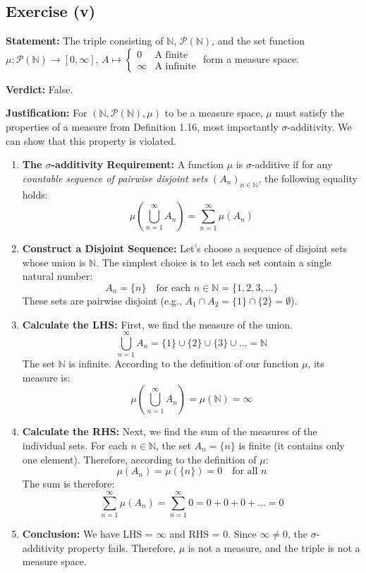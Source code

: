 \documentclass[11pt,a4paper]{article}
\begin{document}
\subsection*{Exercise (v)}
\textbf{Statement:} The triple consisting of $\mathbb{N}$, $\mathcal{P}(\mathbb{N})$, and the set function $\mu: \mathcal{P}(\mathbb{N}) \to [0, \infty]$, $A \mapsto \begin{cases} 0 & \text{A finite} \\ \infty & \text{A infinite} \end{cases}$ form a measure space.

\vspace{1em}

\textbf{Verdict:} False.

\textbf{Justification:}
For $(\mathbb{N}, \mathcal{P}(\mathbb{N}), \mu)$ to be a measure space, $\mu$ must satisfy the properties of a measure from Definition 1.16, most importantly $\sigma$-additivity. We can show that this property is violated.

\begin{enumerate}
    \item \textbf{The $\sigma$-additivity Requirement:} A function $\mu$ is $\sigma$-additive if for any \emph{countable sequence of pairwise disjoint sets} $(A_n)_{n \in \mathbb{N}}$, the following equality holds:
    \[
        \mu\left(\bigcup_{n=1}^\infty A_n\right) = \sum_{n=1}^\infty \mu(A_n)
    \]

    \item \textbf{Construct a Disjoint Sequence:} Let's choose a sequence of disjoint sets whose union is $\mathbb{N}$. The simplest choice is to let each set contain a single natural number:
    \[
        A_n = \{n\} \quad \text{for each } n \in \mathbb{N} = \{1, 2, 3, \dots\}
    \]
    These sets are pairwise disjoint (e.g., $A_1 \cap A_2 = \{1\} \cap \{2\} = \emptyset$).

    \item \textbf{Calculate the LHS:} First, we find the measure of the union.
    \[
        \bigcup_{n=1}^\infty A_n = \{1\} \cup \{2\} \cup \{3\} \cup \dots = \mathbb{N}
    \]
    The set $\mathbb{N}$ is infinite. According to the definition of our function $\mu$, its measure is:
    \[
        \mu\left(\bigcup_{n=1}^\infty A_n\right) = \mu(\mathbb{N}) = \infty
    \]

    \item \textbf{Calculate the RHS:} Next, we find the sum of the measures of the individual sets.
    For each $n \in \mathbb{N}$, the set $A_n = \{n\}$ is finite (it contains only one element). Therefore, according to the definition of $\mu$:
    \[
        \mu(A_n) = \mu(\{n\}) = 0 \quad \text{for all } n
    \]
    The sum is therefore:
    \[
        \sum_{n=1}^\infty \mu(A_n) = \sum_{n=1}^\infty 0 = 0 + 0 + 0 + \dots = 0
    \]

    \item \textbf{Conclusion:} We have LHS = $\infty$ and RHS = 0. Since $\infty \neq 0$, the $\sigma$-additivity property fails. Therefore, $\mu$ is not a measure, and the triple is not a measure space.
\end{enumerate}
\end{document}
